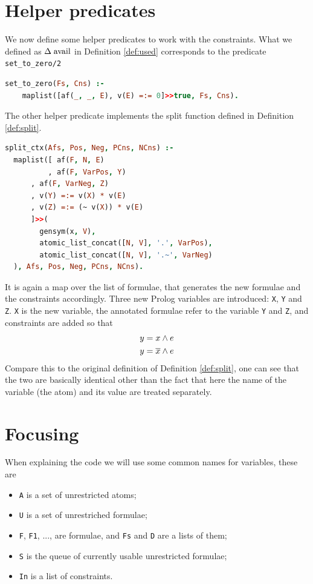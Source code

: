 \documentclass[a4paper, 12pt, tesi, english]{report}
\begin{document}
\section{Helper predicates}\label{sec:helper}
We now define some helper predicates to work with the constraints.
What we defined as $\Delta \; \text{avail}$ in Definition \ref{def:used} corresponds to the predicate \texttt{set\_to\_zero/2}
\begin{lstlisting}[language=prolog, numbers=none]
%! set_to_zero(+[AFs], -[Constr]) is det.
set_to_zero(Fs, Cns) :-
    maplist([af(_, _, E), v(E) =:= 0]>>true, Fs, Cns).
\end{lstlisting}

The other helper predicate implements the split function defined in Definition \ref{def:split}.
\begin{lstlisting}[language=prolog, numbers=none]
%! split_ctx(+[AFs], -[AFs], -[AFs], -[Cns], -[Cns]) is det.
split_ctx(Afs, Pos, Neg, PCns, NCns) :-
  maplist([ af(F, N, E)
          , af(F, VarPos, Y)
  	  , af(F, VarNeg, Z)
  	  , v(Y) =:= v(X) * v(E)
  	  , v(Z) =:= (~ v(X)) * v(E)
  	  ]>>(
  	    gensym(x, V),
  	    atomic_list_concat([N, V], '.', VarPos),
  	    atomic_list_concat([N, V], '.~', VarNeg)
  ), Afs, Pos, Neg, PCns, NCns).
\end{lstlisting}
It is again a map over the list of formulae, that generates the new formulae and the constraints accordingly.
Three new Prolog variables are introduced: \texttt{X}, \texttt{Y} and \texttt{Z}.
\texttt{X} is the new variable, the annotated formulae refer to the variable \texttt{Y} and \texttt{Z}, and constraints are added so that
\begin{align*}
	y &= x \wedge e \\
	y &= \overline{x} \wedge e \\
\end{align*}
Compare this to the original definition of Definition \ref{def:split}, one can see that the two are basically identical other than the fact that here the name of the variable (the atom) and its value are treated separately.

\section{Focusing}
When explaining the code we will use some common names for variables, these are
\begin{itemize}
	\item \texttt{A} is a set of unrestricted atoms;
	\item \texttt{U} is a set of unrestriched formulae;
	\item \texttt{F}, \texttt{F1}, ..., are formulae, and \texttt{Fs} and \texttt{D} are a lists of them;
	\item \texttt{S} is the queue of currently usable unrestricted formulae;
	\item \texttt{In} is a list of constraints.
\end{itemize}
\end{document}

